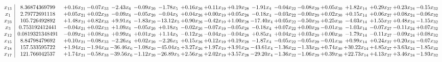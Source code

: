 \documentclass[9pt]{article}
\begin{document}
 \[\begin{array}{c| c c@{\hskip 2pt} c@{\hskip 2pt} c@{\hskip 2pt} c@{\hskip 2pt} c@{\hskip 2pt} c@{\hskip 2pt} c@{\hskip 2pt} c@{\hskip 2pt} c@{\hskip 2pt} c@{\hskip 2pt} c@{\hskip 2pt} c@{\hskip 2pt} c@{\hskip 2pt} c@{\hskip 2pt} c@{\hskip 2pt} c@{\hskip 2pt} }
 x_{13}   &  8.36874369799 & +  0.16 x_{21} & -0.07 x_{33} & -2.43 x_{6} & -0.09 x_{20} & -1.78 x_{5} & +  0.16 x_{26} & +  0.11 x_{19} & +  0.19 x_{28} & -1.91 x_{4} & -0.04 x_{22} & -0.08 x_{29} & +  0.05 x_{30} & +  1.82 x_{14} & +  0.29 x_{27} & +  0.23 x_{24} & -0.15 x_{32}\\
 x_{1}   &  2.79772691118 & +  0.05 x_{21} & +  0.02 x_{33} & -0.09 x_{6} & -0.05 x_{20} & -0.04 x_{5} & +  0.04 x_{26} & +  0.00 x_{19} & +  0.05 x_{28} & -0.18 x_{4} & -0.03 x_{22} & -0.00 x_{29} & +  0.02 x_{30} & +  0.15 x_{14} & +  0.06 x_{27} & +  0.08 x_{24} & -0.06 x_{32}\\
 x_{23}   &  105.726492892 & +  1.48 x_{21} & +  0.82 x_{33} & +  9.91 x_{6} & -1.83 x_{20} & -13.12 x_{5} & +  0.90 x_{26} & -0.42 x_{19} & +  1.00 x_{28} & -17.40 x_{4} & +  0.05 x_{22} & -0.50 x_{29} & +  0.25 x_{30} & -4.03 x_{14} & +  1.55 x_{27} & +  0.48 x_{24} & -1.15 x_{32}\\
 x_{3}   &  0.753192412441 & -0.04 x_{21} & +  0.02 x_{33} & +  1.09 x_{6} & -0.05 x_{20} & +  0.18 x_{5} & -0.02 x_{26} & -0.07 x_{19} & -0.05 x_{28} & -0.18 x_{4} & +  0.07 x_{22} & +  0.00 x_{29} & -0.01 x_{30} & -1.03 x_{14} & -0.07 x_{27} & -0.11 x_{24} & +  0.07 x_{32}\\
 x_{12}   &  0.0819321348491 & -0.09 x_{21} & +  0.08 x_{33} & +  0.99 x_{6} & +  0.01 x_{20} & +  1.14 x_{5} & -0.12 x_{26} & -0.04 x_{19} & -0.04 x_{28} & +  0.85 x_{4} & +  0.04 x_{22} & +  0.03 x_{29} & +  0.00 x_{30} & -1.79 x_{14} & -0.11 x_{27} & -0.09 x_{24} & +  0.08 x_{32}\\
 x_{15}   &  8.84798479692 & +  0.10 x_{21} & -0.08 x_{33} & -2.26 x_{6} & +  0.02 x_{20} & -2.26 x_{5} & +  0.15 x_{26} & +  0.12 x_{19} & +  0.19 x_{28} & -1.87 x_{4} & -0.05 x_{22} & -0.05 x_{29} & -0.01 x_{30} & +  0.99 x_{14} & +  0.24 x_{27} & +  0.20 x_{24} & -0.07 x_{32}\\
 x_{18}   &  157.533595722 & +  1.94 x_{21} & -1.94 x_{33} & -36.46 x_{6} & -1.08 x_{20} & -45.04 x_{5} & +  3.27 x_{26} & +  1.97 x_{19} & +  3.91 x_{28} & -43.61 x_{4} & -1.36 x_{22} & -1.33 x_{29} & +  0.74 x_{30} & + 30.22 x_{14} & +  4.85 x_{27} & +  3.63 x_{24} & -1.85 x_{32}\\
 x_{17}   &  121.766042537 & +  1.74 x_{21} & -0.58 x_{33} & -39.56 x_{6} & -1.12 x_{20} & -26.89 x_{5} & +  2.56 x_{26} & +  2.02 x_{19} & +  3.57 x_{28} & -29.20 x_{4} & -1.36 x_{22} & -1.06 x_{29} & +  0.39 x_{30} & + 22.73 x_{14} & +  4.13 x_{27} & +  3.46 x_{24} & -1.93 x_{32}\\

\end{array}\]
\end{document}
